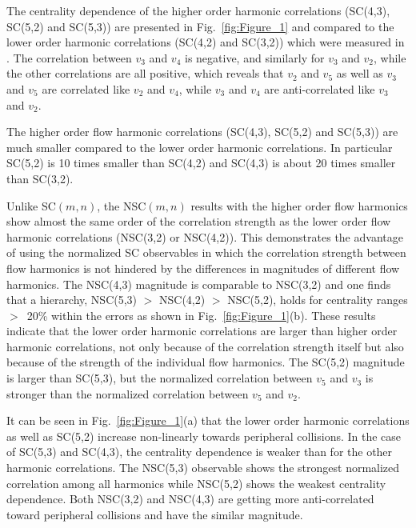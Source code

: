 The centrality dependence of the higher order harmonic correlations (SC(4,3), SC(5,2) and SC(5,3)) are presented in Fig.~\ref{fig:Figure_1} and compared to the lower order harmonic correlations (SC(4,2) and SC(3,2)) which were measured in \cite{ALICE:2016kpq}. The correlation between $v_3$ and $v_4$ is negative, and similarly for $v_3$ and $v_2$, while the other correlations are all positive, which reveals that $v_2$ and $v_5$ as well as $v_3$ and $v_5$ are correlated like $v_2$ and $v_4$, while $v_3$ and $v_4$ are anti-correlated like $v_3$ and $v_2$.

The higher order flow harmonic correlations (SC(4,3), SC(5,2) and SC(5,3)) are much smaller compared to the lower order harmonic correlations.
In particular SC(5,2) is 10 times smaller than SC(4,2) and SC(4,3) is about 20 times smaller than SC(3,2).

Unlike SC$(m,n)$, the NSC$(m,n)$ results with the higher order flow harmonics show almost the same order of the correlation strength as the lower order flow harmonic correlations (NSC(3,2) or NSC(4,2)).
This demonstrates the advantage of using the normalized SC observables in which the correlation strength between flow harmonics is not hindered by the differences in magnitudes of different flow harmonics. The NSC(4,3) magnitude is comparable to NSC(3,2) and one finds that a hierarchy, NSC(5,3) $>$ NSC(4,2) $>$ NSC(5,2), holds for centrality ranges $>$~20\% within the errors as shown in Fig.~\ref{fig:Figure_1}(b).
These results indicate that the lower order harmonic correlations are larger than higher order harmonic correlations, not only because of the correlation strength itself but also because of the strength of the individual flow harmonics. 
The SC(5,2) magnitude is larger than SC(5,3), but the normalized correlation between $v_5$ and $v_3$ is stronger than the normalized correlation between $v_5$ and $v_2$. 

It can be seen in Fig.~\ref{fig:Figure_1}(a) that the lower order harmonic correlations as well as SC(5,2) increase non-linearly towards peripheral collisions.
In the case of SC(5,3) and SC(4,3), the centrality dependence is weaker than for the other harmonic correlations.
The NSC(5,3) observable shows the strongest normalized correlation among all harmonics while NSC(5,2) shows the weakest centrality dependence.
Both NSC(3,2) and NSC(4,3) are getting more anti-correlated toward peripheral collisions and have the similar magnitude.

